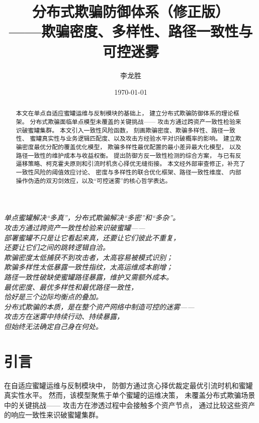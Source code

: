 \documentclass[11pt,a4paper]{article}
\title{分布式欺骗防御体系（修正版）\\
——欺骗密度、多样性、路径一致性与可控迷雾}
\author{李龙胜}
\date{\today}
\begin{document}
\maketitle

\begin{center}
\textit{
单点蜜罐解决“多真”，分布式欺骗解决“多密”和“多杂”。\\
攻击方通过跨资产一致性检验来识破蜜罐——\\
部署蜜罐不只是让它看起来真，还要让它们彼此不重复，\\
还要让它们之间的跳转逻辑自洽。\\
欺骗密度太低捕获不到攻击者，太高容易被模式识别；\\
欺骗多样性太低暴露一致性指纹，太高运维成本剧增；\\
路径一致性破缺使蜜罐路径暴露，维护又需额外成本。\\
最优密度、最优多样性和最优路径一致性，\\
恰好是三个边际均衡点的叠加。\\
分布式欺骗的本质，是在整个资产网络中制造可控的迷雾——\\
攻击方在迷雾中持续行动、持续暴露，\\
但始终无法确定自己身在何处。
}
\end{center}

\vspace{5mm}

\begin{abstract}
本文在单点自适应蜜罐运维与反制模块的基础上，
建立分布式欺骗防御体系的理论框架。
分布式欺骗面临单点模型未覆盖的关键挑战——
攻击方通过跨资产一致性检验来识破蜜罐集群。
本文引入一致性风险函数，
刻画欺骗密度、欺骗多样性、路径一致性、
蜜罐真实性与业务逻辑匹配度、以及攻击方经验水平对识破概率的影响。
建立欺骗密度最优分配的覆盖优化模型，
欺骗多样性最优配置的最小差异最大化模型，
以及路径一致性的维护成本与收益权衡。
提出防御方反一致性检测的综合方案，
与已有反逼移策略、柯克霍夫原则和引流时机贪心择优无缝衔接。
本文经外部审查修正，补充了一致性风险的阈值效应讨论、
密度与多样性的联合优化框架、路径一致性维度、
内部操作伪造的双刃剑效应，以及“可控迷雾”的核心哲学表达。
\end{abstract}

\tableofcontents

\section{引言}

在自适应蜜罐运维与反制模块中，
防御方通过贪心择优裁定最优引流时机和蜜罐真实性水平。
然而，该模型聚焦于单个蜜罐的运维决策，
未覆盖分布式欺骗场景中的关键挑战——
攻击方在渗透过程中会接触多个资产节点，
通过比较这些资产的响应一致性来识破蜜罐集群。
\end{document}
